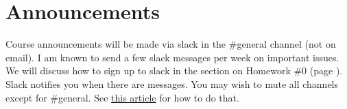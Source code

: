 
\section*{Announcements}

Course announcements will be made via slack in the \#general channel (not on email). I am known to send a few slack messages per week on important issues.  We will discuss how to sign up to slack in the section on Homework \#0 (page \pageref{subsec:homework_zero}). Slack notifies you when there are messages. You may wish to mute all channels except for \#general. See \href{https://slack.com/help/articles/204411433-Mute-channels-and-direct-messages}{this article} for how to do that.